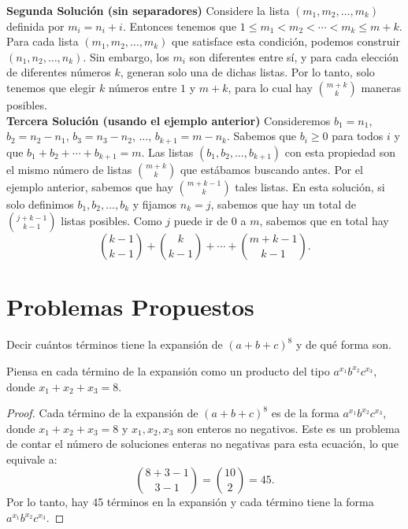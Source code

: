 \documentclass[11pt]{scrartcl}
\begin{document}
\textbf{Segunda Solución (sin separadores)} Considere la lista $(m_1, m_2, \dots, m_k)$ definida por $m_i = n_i + i$. Entonces tenemos que $1 \leq m_1 < m_2 < \cdots < m_k \leq m + k$. Para cada lista $(m_1, m_2, \dots, m_k)$ que satisface esta condición, podemos construir $(n_1, n_2, \dots, n_k)$. Sin embargo, los $m_i$ son diferentes entre sí, y para cada elección de diferentes números $k$, generan solo una de dichas listas. Por lo tanto, solo tenemos que elegir $k$ números entre $1$ y $m+k$, para lo cual hay $\binom{m+k}{k}$ maneras posibles.\\

\textbf{Tercera Solución (usando el ejemplo anterior)} Consideremos $b_1 = n_1$, $b_2 = n_2 - n_1$, $b_3 = n_3 - n_2$, $\dots$, $b_{k+1} = m - n_k$. Sabemos que $b_i \geq 0$ para todos $i$ y que $b_1 + b_2 + \cdots + b_{k+1} = m$. Las listas $(b_1, b_2, \dots, b_{k+1})$ con esta propiedad son el mismo número de listas $\binom{m+k}{k}$ que estábamos buscando antes. Por el ejemplo anterior, sabemos que hay $\binom{m+k-1}{k}$ tales listas. En esta solución, si solo definimos $b_1, b_2, \dots, b_k$ y fijamos $n_k = j$, sabemos que hay un total de $\binom{j+k-1}{k-1}$ listas posibles. Como $j$ puede ir de $0$ a $m$, sabemos que en total hay \[\binom{k-1}{k-1} + \binom{k}{k-1} + \cdots + \binom{m+k-1}{k-1}.\]


\section{Problemas Propuestos}
\begin{problem}
Decir cuántos términos tiene la expansión de $(a+b+c)^8$ y de qué forma son.
\begin{hint}
Piensa en cada término de la expansión como un producto del tipo $a^{x_1} b^{x_2} c^{x_3}$, donde $x_1 + x_2 + x_3 = 8$. 
\begin{proof}
Cada término de la expansión de $(a+b+c)^8$ es de la forma $a^{x_1} b^{x_2} c^{x_3}$, donde $x_1 + x_2 + x_3 = 8$ y $x_1, x_2, x_3$ son enteros no negativos. Este es un problema de contar el número de soluciones enteras no negativas para esta ecuación, lo que equivale a:
\[
\binom{8+3-1}{3-1} = \binom{10}{2} = 45.
\]
Por lo tanto, hay 45 términos en la expansión y cada término tiene la forma $a^{x_1} b^{x_2} c^{x_3}$.
\end{proof}
\end{hint}
\end{problem}
\end{document}
